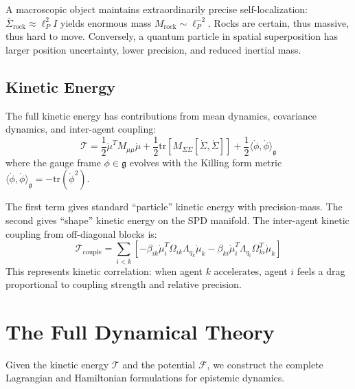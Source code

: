 \documentclass[11pt]{article}
\begin{document}
A macroscopic object maintains extraordinarily precise self-localization: $\bar{\Sigma}_{\mathrm{rock}} \approx \ell_P^2 I$ yields enormous mass $M_{\mathrm{rock}} \sim \ell_P^{-2}$. Rocks are certain, thus massive, thus hard to move. Conversely, a quantum particle in spatial superposition has larger position uncertainty, lower precision, and reduced inertial mass.

\subsection{Kinetic Energy}

The full kinetic energy has contributions from mean dynamics, covariance dynamics, and inter-agent coupling:
\begin{equation}
\mathcal{T} = \frac{1}{2}\dot{\mu}^T M_{\mu\mu} \dot{\mu} + \frac{1}{2}\mathrm{tr}\left[M_{\Sigma\Sigma}[\dot{\Sigma}, \dot{\Sigma}]\right] + \frac{1}{2}\langle\dot{\phi}, \dot{\phi}\rangle_{\mathfrak{g}}
\label{eq:full_kinetic}
\end{equation}
where the gauge frame $\phi \in \mathfrak{g}$ evolves with the Killing form metric $\langle \dot{\phi}, \dot{\phi} \rangle_{\mathfrak{g}} = -\mathrm{tr}(\dot{\phi}^2)$.

The first term gives standard ``particle'' kinetic energy with precision-mass. The second gives ``shape'' kinetic energy on the SPD manifold. The inter-agent kinetic coupling from off-diagonal blocks is:
\begin{equation}
\mathcal{T}_{\mathrm{couple}} = \sum_{i < k}\left[-\beta_{ik}\dot{\mu}_i^T \Omega_{ik}\Lambda_{q_k}\dot{\mu}_k - \beta_{ki}\dot{\mu}_i^T \Lambda_{q_i}\Omega_{ki}^T \dot{\mu}_k\right]
\end{equation}
This represents kinetic correlation: when agent $k$ accelerates, agent $i$ feels a drag proportional to coupling strength and relative precision.

\section{The Full Dynamical Theory}
\label{sec:dynamics}

Given the kinetic energy $\mathcal{T}$ and the potential $\mathcal{F}$, we construct the complete Lagrangian and Hamiltonian formulations for epistemic dynamics.
\end{document}
